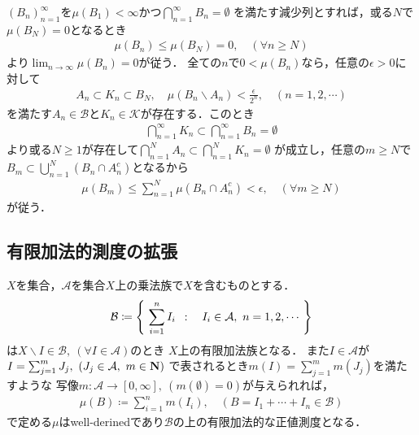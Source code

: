 		\begin{prf}
			$(B_n)_{n=1}^\infty$を$\mu(B_1) < \infty$かつ$\bigcap_{n=1}^\infty B_n = \emptyset$
			を満たす減少列とすれば，或る$N$で$\mu(B_N) = 0$となるとき
			\begin{align}
				\mu(B_n) \leq \mu(B_N) = 0,
				\quad (\forall n \geq N)
			\end{align}
			より$\lim_{n \to \infty} \mu(B_n) = 0$が従う．
			全ての$n$で$0 < \mu(B_n)$なら，任意の$\epsilon > 0$に対して
			\begin{align}
				A_n \subset K_n \subset B_N,
				\quad \mu(B_n \backslash A_n) < \frac{\epsilon}{2^n},
				\quad (n=1,2,\cdots)
			\end{align}
			を満たす$A_n \in \mathcal{B}$と$K_n \in \mathcal{K}$が存在する．このとき
			\begin{align}
				\bigcap_{n=1}^\infty K_n \subset \bigcap_{n=1}^\infty B_n = \emptyset
			\end{align}
			より或る$N \geq 1$が存在して$\bigcap_{n=1}^N A_n \subset \bigcap_{n=1}^N K_n = \emptyset$
			が成立し，任意の$m \geq N$で$B_m \subset \bigcup_{n=1}^N (B_n \cap A_n^c)$となるから
			\begin{align}
				\mu(B_m) \leq \sum_{n=1}^N \mu(B_n \cap A_n^c) < \epsilon,
				\quad (\forall m \geq N)
			\end{align}
			が従う．
			\QED
		\end{prf}
		
	\subsection{有限加法的測度の拡張}
		\begin{screen}
			\begin{thm}[有限加法的な正値測度空間の生成]\label{thm:forming_finitely_additive_class}
				$X$を集合，$\mathcal{A}$を集合$X$上の乗法族で$X$を含むものとする．
				\begin{align}
					\mathcal{B} \coloneqq \left\{\ \sum_{i=1}^n I_i\ \, : \quad I_i \in \mathcal{A},\ n=1,2,\cdots\ \right\}
				\end{align}
				は$X\backslash I \in \mathcal{B},\ (\forall I \in \mathcal{A})$のとき
				$X$上の有限加法族となる．
				また$I \in \mathcal{A}$が$I = \sum_{j=1}^m J_j,\ (J_j \in \mathcal{A},\ m \in \mathbf{N})$
				で表されるとき$m(I) = \sum_{j=1}^m m(J_j)$を満たすような
				写像$m:\mathcal{A} \longrightarrow [0,\infty],\ (m(\emptyset)=0)$が与えられれば，
				\begin{align}
					\mu(B) \coloneqq \sum_{i=1}^n m(I_i),
					\quad (B=I_1 + \cdots + I_n \in \mathcal{B})
				\end{align}
				で定める$\mu$はwell-derinedであり$\mathcal{B}$の上の有限加法的な正値測度となる．
			\end{thm}
		\end{screen}
		
